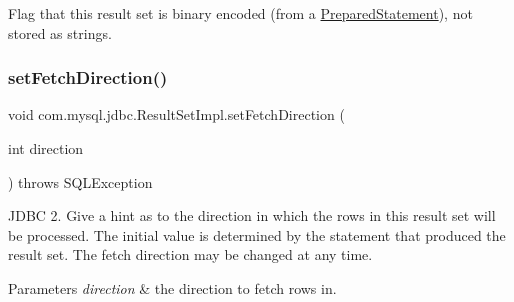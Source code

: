 Flag that this result set is \textquotesingle{}binary\textquotesingle{} encoded (from a \mbox{\hyperlink{classcom_1_1mysql_1_1jdbc_1_1_prepared_statement}{Prepared\+Statement}}), not stored as strings. \mbox{\label{classcom_1_1mysql_1_1jdbc_1_1_result_set_impl_a4bbd51f442eae410996aca75a318e54a}} 
\subsubsection{\texorpdfstring{set\+Fetch\+Direction()}{setFetchDirection()}}
{\footnotesize\ttfamily void com.\+mysql.\+jdbc.\+Result\+Set\+Impl.\+set\+Fetch\+Direction (\begin{DoxyParamCaption}\item[{int}]{direction }\end{DoxyParamCaption}) throws S\+Q\+L\+Exception}

J\+D\+BC 2. Give a hint as to the direction in which the rows in this result set will be processed. The initial value is determined by the statement that produced the result set. The fetch direction may be changed at any time.


\begin{DoxyParams}{Parameters}
{\em direction} & the direction to fetch rows in.\\
\hline
\end{DoxyParams}

